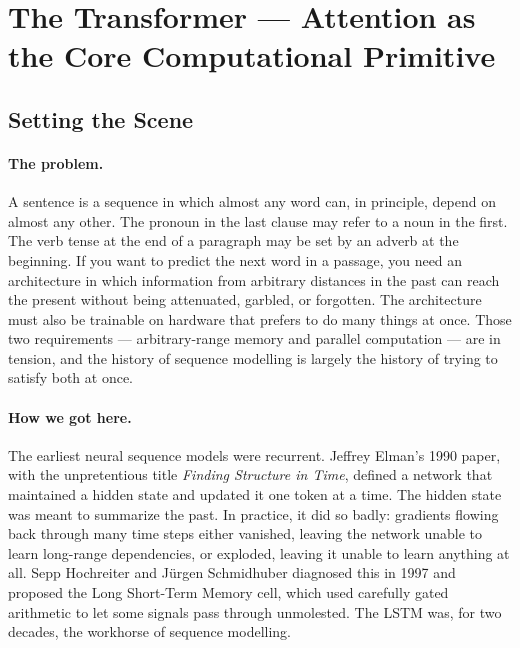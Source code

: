 \section{The Transformer --- Attention as the Core Computational Primitive}
\label{sec:week4-transformer}

\subsection*{Setting the Scene}

\paragraph{The problem.}
A sentence is a sequence in which almost any word can, in principle,
depend on almost any other. The pronoun in the last clause may refer
to a noun in the first. The verb tense at the end of a paragraph may
be set by an adverb at the beginning. If you want to predict the next
word in a passage, you need an architecture in which information from
arbitrary distances in the past can reach the present without being
attenuated, garbled, or forgotten. The architecture must also be
trainable on hardware that prefers to do many things at once. Those
two requirements --- arbitrary-range memory and parallel
computation --- are in tension, and the history of sequence
modelling is largely the history of trying to satisfy both at once.

\paragraph{How we got here.}
The earliest neural sequence models were recurrent. Jeffrey Elman's
1990 paper, with the unpretentious title \emph{Finding Structure in
Time}, defined a network that maintained a hidden state and updated
it one token at a time. The hidden state was meant to summarize the
past. In practice, it did so badly: gradients flowing back through
many time steps either vanished, leaving the network unable to
learn long-range dependencies, or exploded, leaving it unable to
learn anything at all. Sepp Hochreiter and J\"urgen Schmidhuber
diagnosed this in 1997 and proposed the Long Short-Term Memory cell,
which used carefully gated arithmetic to let some signals pass
through unmolested. The LSTM was, for two decades, the workhorse of
sequence modelling.

